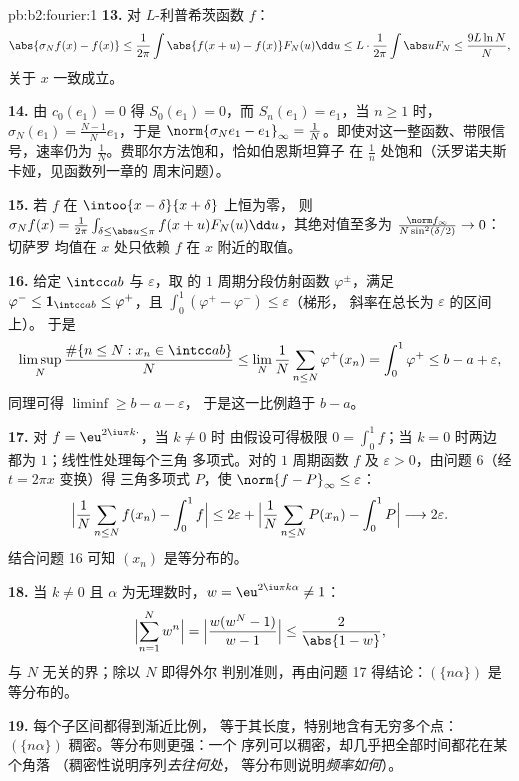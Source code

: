\begin{solution}{pb:b2:fourier:1}
\textbf{13.} 对 $L$-利普希茨函数 $f$：
\[
\abs{\sigma_Nf(x) - f(x)}
\leq \frac{1}{2\pi}\int\abs{f(x+u) - f(x)}F_N(u)\dd u
\leq L\cdot\frac{1}{2\pi}\int\abs uF_N
\leq \frac{9L\ln N}{N},
\]
关于 $x$ 一致成立。

\textbf{14.} 由 $c_0(e_1) = 0$ 得 $S_0(e_1) = 0$，而
$S_n(e_1) = e_1$，当 $n \geq 1$ 时，$\sigma_N(e_1) =
\frac{N-1}{N}e_1$，于是 $\norm{\sigma_Ne_1 - e_1}_\infty =
\frac1N$。即使对这一整函数、带限信号，速率仍为
$\frac1N$。费耶尔方法饱和，恰如伯恩斯坦算子
在 $\frac1n$ 处饱和（沃罗诺夫斯卡娅，见函数列一章的
周末问题）。

\textbf{15.} 若 $f$ 在 $\intoo{x-\delta}{x+\delta}$ 上恒为零，
则 $\sigma_Nf(x) = \frac{1}{2\pi}\int_{\delta \leq \abs u
\leq \pi}f(x+u)F_N(u)\dd u$，其绝对值至多为
$\frac{\norm f_\infty}{N\sin^2(\delta/2)} \to 0$：切萨罗
均值在 $x$ 处只依赖 $f$ 在 $x$ 附近的取值。

\textbf{16.} 给定 $\intcc ab$ 与 $\varepsilon$，取
的 $1$ 周期分段仿射函数 $\varphi^\pm$，满足
$\varphi^- \leq \mathbf 1_{\intcc ab} \leq \varphi^+$，且
$\int_0^1(\varphi^+ - \varphi^-) \leq \varepsilon$（梯形，
斜率在总长为 $\varepsilon$ 的区间上）。
于是
\[
\limsup_N\frac{\#\{n \leq N : x_n \in \intcc ab\}}{N}
\leq \lim_N\frac1N\sum_{n\leq N}\varphi^+(x_n)
= \int_0^1\varphi^+ \leq b - a + \varepsilon ,
\]
同理可得 $\liminf \geq b - a - \varepsilon$，
于是这一比例趋于 $b - a$。

\textbf{17.} 对 $f = \eu^{2\iu\pi k\cdot}$，当 $k \neq 0$ 时
由假设可得极限 $0 = \int_0^1f$；当 $k = 0$ 时两边
都为 $1$；线性性处理每个三角
多项式。对的 $1$ 周期函数 $f$ 及 $\varepsilon >
0$，由问题 6（经 $t = 2\pi x$ 变换）得
三角多项式 $P$，使 $\norm{f - P}_\infty \leq
\varepsilon$：
\[
\Bigl|\frac1N\sum_{n\leq N}f(x_n) - \int_0^1f\Bigr|
\leq 2\varepsilon +
\Bigl|\frac1N\sum_{n\leq N}P(x_n) - \int_0^1P\Bigr|
\longrightarrow 2\varepsilon .
\]
结合问题 16 可知 $(x_n)$ 是等分布的。

\textbf{18.} 当 $k \neq 0$ 且 $\alpha$ 为无理数时，$w =
\eu^{2\iu\pi k\alpha} \neq 1$：
\[
\Bigl|\sum_{n=1}^{N}w^n\Bigr|
= \Bigl|\frac{w(w^N - 1)}{w - 1}\Bigr|
\leq \frac{2}{\abs{1 - w}} ,
\]
与 $N$ 无关的界；除以 $N$ 即得外尔
判别准则，再由问题 17 得结论：$(\{n\alpha\})$ 是
等分布的。

\textbf{19.} 每个子区间都得到渐近比例，
等于其长度，特别地含有无穷多个点：
$(\{n\alpha\})$ 稠密。等分布则更强：一个
序列可以稠密，却几乎把全部时间都花在某个角落
（稠密性说明序列\emph{去往何处}，
等分布则说明\emph{频率如何}）。


\end{solution}
